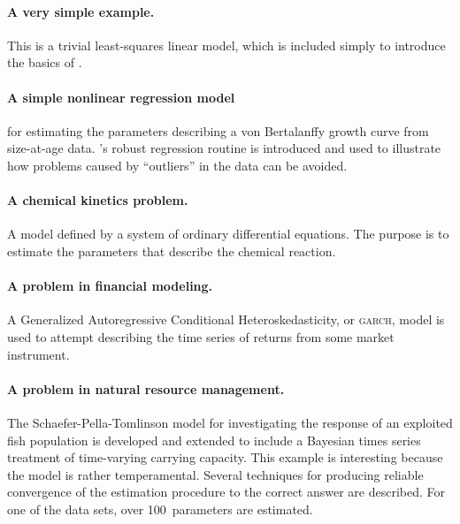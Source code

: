 \documentclass{admbmanual}
\begin{document}
\paragraph{A very simple example.} This is a trivial least-squares linear model,
which is included simply to introduce the basics of \ADM.

\paragraph{A simple nonlinear regression model} for estimating the parameters
describing a von Bertalanffy growth curve from size-at-age data. \ADM's robust
regression routine is introduced and used to illustrate how problems caused by
``outliers'' in the data can be avoided.

\paragraph{A chemical kinetics problem.} A model defined by a system of ordinary
differential equations. The purpose is to estimate the parameters that describe
the chemical reaction.

\paragraph{A problem in financial modeling.} A Generalized Autoregressive
Conditional Hetero\-ske\-dast\-icity, or \textsc{garch}, model is used to
attempt describing the time series of returns from some market instrument.

\paragraph{A problem in natural resource management.} The
Schaefer-Pella-Tomlinson model for investigating the response of an exploited
fish population is developed and extended to include a Bayesian times series
treatment of time-varying carrying capacity. This example is interesting because
the model is rather temperamental. Several techniques for producing reliable
convergence of the estimation procedure to the correct answer are described. For
one of the data sets, over 100~parameters are estimated.
\end{document}
